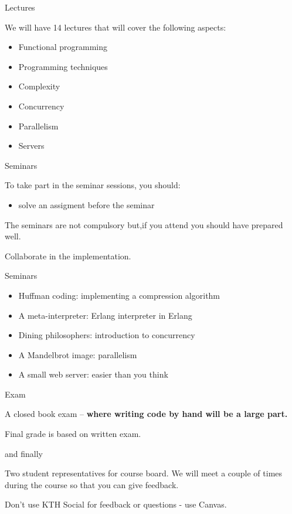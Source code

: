 \begin{frame}{Lectures}

   We will have 14 lectures that will cover the following aspects:


  \begin{itemize}
    \item Functional programming
\pause
    \item Programming techniques
\pause
    \item Complexity 
\pause
    \item Concurrency 
\pause
    \item Parallelism
\pause
    \item Servers
  \end{itemize}
\end{frame}


\begin{frame}{Seminars}

  To take part in the seminar sessions, you should:
  \begin{itemize}
  \item solve an assigment before the seminar
  \end{itemize}

  \pause \vspace{20pt}
  The seminars are not compulsory but,\pause if you attend you should have prepared well. 

  \pause \vspace{20pt}
  Collaborate in the implementation.

\end{frame}

\begin{frame}{Seminars}
  \begin{itemize}
    \item Huffman coding: implementing a compression algorithm \pause
    \item A meta-interpreter: Erlang interpreter in Erlang \pause
    \item Dining philosophers: introduction to concurrency \pause
    \item A Mandelbrot image: parallelism \pause
    \item A small web server: easier than you think
  \end{itemize}
\end{frame}

\begin{frame}{Exam}

\pause A closed book exam -- {\bf where writing code by hand will be a large part.}

\vspace{20pt}

\pause Final grade is based on written exam. 

\end{frame}

\begin{frame}{and finally}

  Two student representatives for course board. We will meet a couple
  of times during the course so that you can give feedback.

\pause\vspace{20pt}

Don't use KTH Social for feedback or questions - use Canvas. 

\end{frame}


